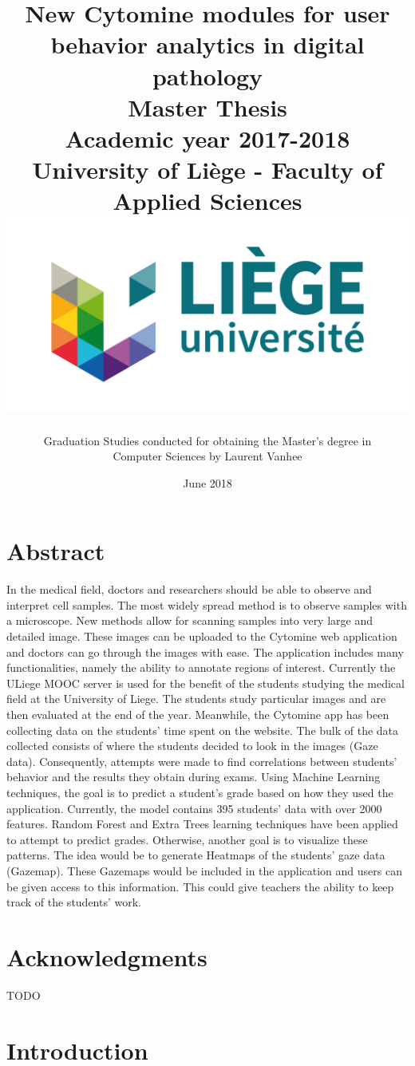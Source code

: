 \documentclass[a4paper,11pt]{report}
\title{
\LARGE
\textbf{New Cytomine modules for user behavior analytics in digital pathology}\\
\vspace{1cm}
Master Thesis\\
\vspace{0.3cm}
Academic year 2017-2018\\
University of Li\`{e}ge - Faculty of Applied Sciences\\
\vspace{3cm}
\includegraphics[scale=0.75]{images/logo.jpg}
\vspace{2cm}
}
\author{ Graduation Studies conducted for obtaining the Master's degree in \\Computer Sciences by Laurent Vanhee}
\date{June 2018}
\numberwithin{figure}{section} %
\begin{document}
\pagestyle{empty}
\maketitle
\pagestyle{fancy}
\fancyhf{}
\tableofcontents


\newpage
\chapter{Abstract}
In the medical field, doctors and researchers should be able to observe and interpret cell samples.
The
most widely spread method is to observe samples with a microscope.
New methods allow for scanning
samples into very large and detailed image.
These images can be uploaded to the Cytomine web
application and doctors can go through the images with ease.
The application includes many
functionalities, namely the ability to annotate regions of interest.
Currently the ULiege MOOC server is
used for the benefit of the students studying the medical field at the University of Liege.
The students
study particular images and are then evaluated at the end of the year.
Meanwhile, the Cytomine app
has been collecting data on the students' time spent on the website.
The bulk of the data collected
consists of where the students decided to look in the images (Gaze data).
Consequently, attempts  were made to find correlations between students' behavior and the results they obtain during exams.
Using Machine
Learning techniques, the goal is to predict a student's grade based on how they used the application.
Currently, the model contains 395 students' data with over 2000 features.
Random Forest and Extra Trees
learning techniques have been applied to attempt to predict grades.
Otherwise, another goal is to
visualize these patterns.
The idea would be to generate Heatmaps of the students' gaze data (Gazemap).
These Gazemaps would be included in the application and users can be given access to this information.
This
could give teachers the ability to keep track of the students' work.

\chapter{Acknowledgments}
    {\color{red} TODO}

\chapter{Introduction}
\end{document}
